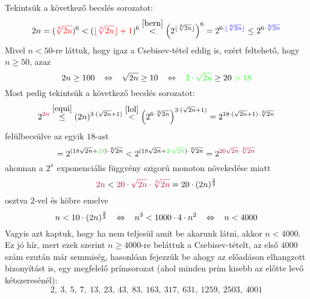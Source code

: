 \documentclass[12pt]{book}
\theoremstyle{plain} %
\theoremstyle{definition} %
\theoremstyle{remark}
\numberwithin{equation}{section}  %
\begin{document}
	Tekintsük a következő becslés sorozatot:
	\begin{equation}\label{lol}
		 2n = (\color{red}\sqrt[6]{2n}\color{black})^6 < (\color{red} \lfloor \sqrt[6]{2n} \rfloor + 1 \color{black})^6 \stackrel{\ref{bern}}{<} \left(2^{\lfloor \sqrt[6]{2n} \rfloor}\right)^6 = 2^{6\cdot \color{blue} \lfloor \sqrt[6]{2n} \rfloor \color{black} } \leq 2^{6\cdot \color{blue} \sqrt[6]{2n} \color{black} }
	\end{equation}
	Mivel $n< 50$-re láttuk, hogy igaz a Csebisev-tétel eddig is, ezért feltehető, hogy $n\geq 50$, azaz
	\[ 2n\geq 100 \hspace{3mm} \Leftrightarrow \hspace{3mm} \sqrt{2n} \geq 10 \hspace{3mm} \Leftrightarrow \hspace{3mm} \color{green}2\cdot \sqrt{2n}\color{black} \geq 20 \color{green}> 18\color{black}   \]
	Most pedig tekintsük a következő becslés sorozatot:
	\[ 2^{\color{purple}2n\color{black}} \stackrel{\ref{equi}}{\leq} (2n)^{3\cdot (\sqrt{2n} + 1)} \stackrel{\ref{lol}}{<} \left(2^{6\cdot \sqrt[6]{2n}}\right)^{3\cdot (\sqrt{2n}+1)} = 2^{18 \cdot (\sqrt{2n}+1)\cdot \sqrt[6]{2n}}  \]
	felülbecsülve az egyik $18$-ast
	\[= 2^{(18 \sqrt{2n}+\color{green}18\color{black})\cdot \sqrt[6]{2n}} <  2^{(18\sqrt{2n} + \color{green}2\cdot \sqrt{2n}\color{black})\cdot \sqrt[6]{2n}} = 2^{\color{purple}20\sqrt{2n}\cdot \sqrt[6]{2n}\color{black}}  \]
	ahonnan a $2^x$ exponenciális függvény szigorú monoton növekedése miatt
	\[ \color{purple} 2n \color{black} < \color{purple} 20\cdot \sqrt{2n} \cdot \sqrt[6]{2n} \color{black} = 20\cdot (2n)^{\frac{2}{3}} \]
	osztva $2$-vel és köbre emelve
	\[ n < 10\cdot (2n)^{\frac{2}{3}} \hspace{3mm} \Leftrightarrow \hspace{3mm} n^3 < 1000 \cdot 4 \cdot n^2 \hspace{3mm} \Leftrightarrow \hspace{3mm} n < 4000  \]
	Vagyis azt kaptuk, hogy ha nem teljesül amit be akarunk látni, akkor $n<4000$. Ez jó hír, mert ezek szerint $n\geq 4000$-re beláttuk a Csebisev-tételt, az első $4000$ szám ezután már semmiség, hasonlóan fejezzük be ahogy az előadáson elhangzott bizonyítást is, egy megfelelő prímsorozat (ahol minden prím kisebb az előtte levő kétszeresénél):
	\[ 2,\ 3,\ 5,\ 7,\ 13,\ 23,\ 43,\ 83,\ 163,\ 317,\ 631,\ 1259,\ 2503,\ 4001  \]
	

	
	\begin{comment}
		\begin{figure}[h] %
		\centering
		\texttt{[image: cimer.jpg]}
		\caption{A kép címe}\label{elsokep}
		\end{figure}
	\end{comment}
	
\end{document}
